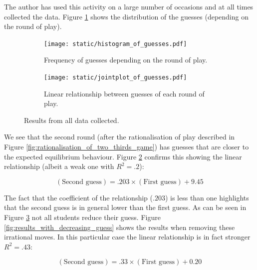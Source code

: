 \documentclass{article}
\begin{document}
The author has used this activity on a large number of occasions and at all
times collected the data. Figure \ref{fig:histogram_of_guess} shows the
distribution of the guesses (depending on the round of play).

\begin{figure}[!hbtp]
    \begin{subfigure}{.6\textwidth}
        \centering
        \texttt{[image: static/histogram\_of\_guesses.pdf]}
        \caption{Frequency of guesses depending on the round of play.}
        \label{fig:histogram_of_guess}
    \end{subfigure}
    \begin{subfigure}{.4\textwidth}
        \centering
        \texttt{[image: static/jointplot\_of\_guesses.pdf]}
        \caption{Linear relationship between guesses of each round of play.}
        \label{fig:jointplot_of_guess}
    \end{subfigure}
    \caption{Results from all data collected.}
    \label{fig:all_results}
\end{figure}

We see that the second round (after the rationalisation of play described in
Figure \ref{fig:rationalisation_of_two_thirds_game}) has guesses that are closer
to the expected equilibrium behaviour.
Figure \ref{fig:jointplot_of_guess} confirms this showing the linear
relationship (albeit a weak one with \(R^2=.2\)):

\begin{equation}
    (\text{Second guess}) = .203\times(\text{First guess}) + 9.45
    \label{eq:linear_relationship}
\end{equation}

The fact that the coefficient of the relationship (\(.203\)) is less than one
highlights that the second guess is in general lower than the first guess. As
can be seen in Figure \ref{fig:all_results} not all students reduce their guess.
Figure \ref{fig:results_with_decreasing_guess} shows the results when removing
these irrational moves. In this particular case the linear relationship is in
fact stronger \(R^2=.43\):

\begin{equation}
    (\text{Second guess}) = .33\times(\text{First guess}) + 0.20
    \label{eq:linear_relationship_for_increasing_guesses}
\end{equation}
\end{document}
